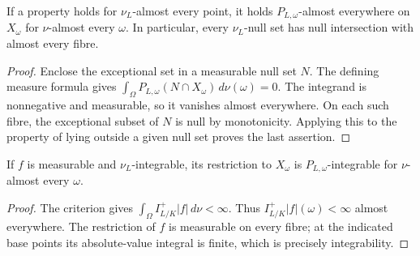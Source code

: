 \begin{lemma}\label{lem:algebraic-ae-fibres}
\leanok
{}
If a property holds for $\nu_L$-almost every point, it holds
$P_{L,\omega}$-almost everywhere on $X_\omega$ for $\nu$-almost every
$\omega$. In particular, every $\nu_L$-null set has null intersection
with almost every fibre.
\end{lemma}
\begin{proof}
Enclose the exceptional set in a measurable null set $N$.
The defining measure formula gives
$\int_\Omega P_{L,\omega}(N\cap X_\omega)\,d\nu(\omega)=0$.
The integrand is nonnegative and measurable, so it vanishes almost
everywhere. On each such fibre, the exceptional subset of $N$ is null
by monotonicity. Applying this to the property of lying outside a
given null set proves the last assertion.
\end{proof}

\begin{lemma}\label{lem:algebraic-measurable-fibre-integrable}
\leanok
{}
If $f$ is measurable and $\nu_L$-integrable, its restriction to
$X_\omega$ is $P_{L,\omega}$-integrable for $\nu$-almost every $\omega$.
\end{lemma}
\begin{proof}
The criterion gives $\int_\Omega I^+_{L/K}|f|\,d\nu<\infty$.
Thus $I^+_{L/K}|f|(\omega)<\infty$ almost everywhere. The restriction
of $f$ is measurable on every fibre; at the indicated base points
its absolute-value integral is finite, which is precisely integrability.
\end{proof}

